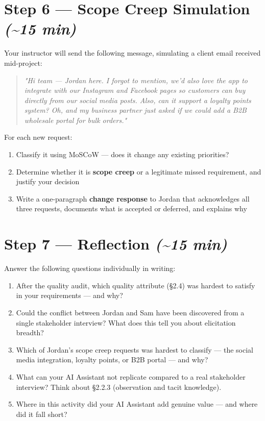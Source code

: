 \documentclass[11pt,a4paper]{book}
\begin{document}
\medskip

\section{Step 6 --- Scope Creep Simulation \textit{(\textasciitilde{}15 min)}}

Your instructor will send the following message, simulating a client email received mid-project:

\begin{quote}
\textit{\textit{"Hi team --- Jordan here. I forgot to mention, we'd also love the app to integrate with our Instagram and Facebook pages so customers can buy directly from our social media posts. Also, can it support a loyalty points system? Oh, and my business partner just asked if we could add a B2B wholesale portal for bulk orders."}}
\end{quote}

For each new request:

\begin{enumerate}
  \item Classify it using MoSCoW --- does it change any existing priorities?
  \item Determine whether it is \textbf{scope creep} or a legitimate missed requirement, and justify your decision
  \item Write a one-paragraph \textbf{change response} to Jordan that acknowledges all three requests, documents what is accepted or deferred, and explains why
\end{enumerate}

\medskip

\section{Step 7 --- Reflection \textit{(\textasciitilde{}15 min)}}

Answer the following questions individually in writing:

\begin{enumerate}
  \item After the quality audit, which quality attribute (§2.4) was hardest to satisfy in your requirements --- and why?
  \item Could the conflict between Jordan and Sam have been discovered from a single stakeholder interview? What does this tell you about elicitation breadth?
  \item Which of Jordan's scope creep requests was hardest to classify --- the social media integration, loyalty points, or B2B portal --- and why?
  \item What can your AI Assistant not replicate compared to a real stakeholder interview? Think about §2.2.3 (observation and tacit knowledge).
  \item Where in this activity did your AI Assistant add genuine value --- and where did it fall short?
\end{enumerate}
\end{document}
